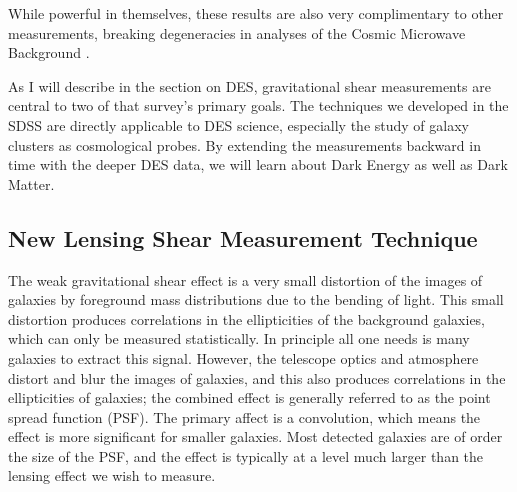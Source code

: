 \documentclass[12pt]{article}
\begin{document}
While powerful in themselves, these results are also very complimentary to
other measurements, breaking degeneracies in analyses of the Cosmic Microwave
Background \cite{KomatsuWMAPCosmo09}. 

As I will describe in the section on DES, gravitational shear measurements
are central to two of that survey's primary goals.  The techniques we developed
in the SDSS are directly applicable to DES science, especially the study of
galaxy clusters as cosmological probes.  By extending the measurements backward
in time with the deeper DES data, we will learn about Dark Energy as well as
Dark Matter.

\subsection{New Lensing Shear Measurement Technique}

The weak gravitational shear effect is a very small distortion of the images of
galaxies by foreground mass distributions due to the bending of light.  This
small distortion produces correlations in the ellipticities of the background
galaxies, which can only be measured statistically.  In principle all one needs
is many galaxies to extract this signal.  However, the telescope optics and
atmosphere distort and blur the images of galaxies, and this also produces
correlations in the ellipticities of galaxies; the combined effect is generally
referred to as the point spread function (PSF). The primary affect is a
convolution, which means the effect is more significant for smaller galaxies.
Most detected galaxies are of order the size of the PSF, and the effect is
typically at a level much larger than the lensing effect we wish to measure.
\end{document}
